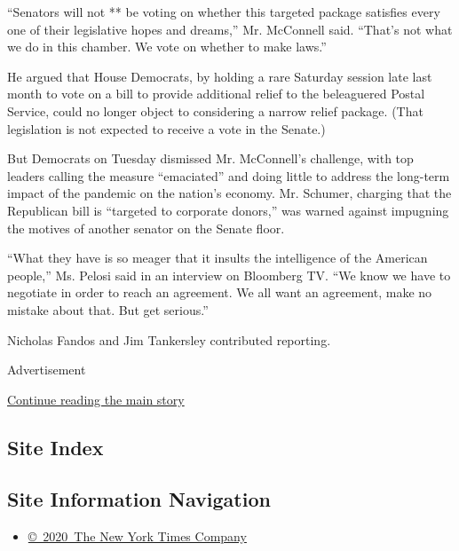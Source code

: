 ``Senators will not ** be voting on whether this targeted package
satisfies every one of their legislative hopes and dreams,'' Mr.
McConnell said. ``That's not what we do in this chamber. We vote on
whether to make laws.''

He argued that House Democrats, by holding a rare Saturday session late
last month to vote on a bill to provide additional relief to the
beleaguered Postal Service, could no longer object to considering a
narrow relief package. (That legislation is not expected to receive a
vote in the Senate.)

But Democrats on Tuesday dismissed Mr. McConnell's challenge, with top
leaders calling the measure ``emaciated'' and doing little to address
the long-term impact of the pandemic on the nation's economy. Mr.
Schumer, charging that the Republican bill is ``targeted to corporate
donors,'' was warned against impugning the motives of another senator on
the Senate floor.

``What they have is so meager that it insults the intelligence of the
American people,'' Ms. Pelosi said in an interview on Bloomberg TV. ``We
know we have to negotiate in order to reach an agreement. We all want an
agreement, make no mistake about that. But get serious.''

Nicholas Fandos and Jim Tankersley contributed reporting.

Advertisement

\protect\hyperlink{after-bottom}{Continue reading the main story}

\hypertarget{site-index}{%
\subsection{Site Index}\label{site-index}}

\hypertarget{site-information-navigation}{%
\subsection{Site Information
Navigation}\label{site-information-navigation}}

\begin{itemize}
\tightlist
\item
  \href{https://help.nytimes3xbfgragh.onion/hc/en-us/articles/115014792127-Copyright-notice}{©~2020~The
  New York Times Company}
\end{itemize}

